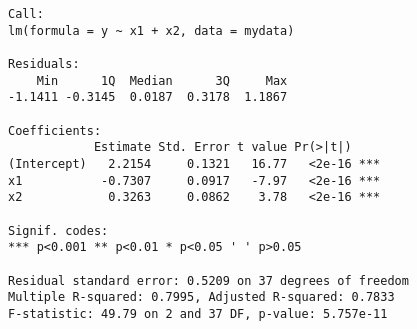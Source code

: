 \documentclass{article}
\begin{document}
\begin{verbatim}
Call:
lm(formula = y ~ x1 + x2, data = mydata)

Residuals:
    Min      1Q  Median      3Q     Max 
-1.1411 -0.3145  0.0187  0.3178  1.1867 

Coefficients:
            Estimate Std. Error t value Pr(>|t|)    
(Intercept)   2.2154     0.1321   16.77   <2e-16 ***
x1           -0.7307     0.0917   -7.97   <2e-16 ***
x2            0.3263     0.0862    3.78   <2e-16 ***

Signif. codes:  
*** p<0.001 ** p<0.01 * p<0.05 ' ' p>0.05

Residual standard error: 0.5209 on 37 degrees of freedom
Multiple R-squared: 0.7995, Adjusted R-squared: 0.7833 
F-statistic: 49.79 on 2 and 37 DF, p-value: 5.757e-11
\end{verbatim}
\end{document}
